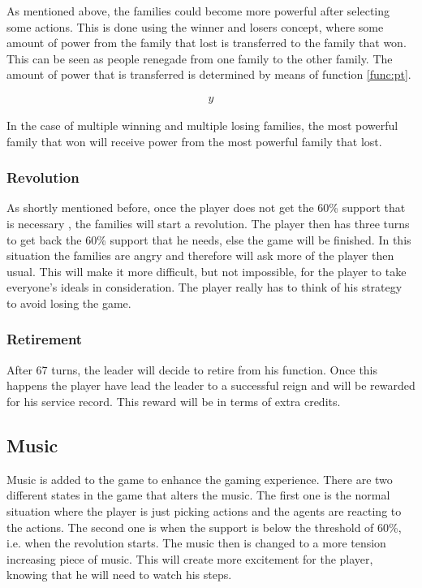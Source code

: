 \documentclass[11pt,a4paper]{article}
\begin{document}
As mentioned above, the families could become more powerful after selecting some actions. This is done using the winner and losers concept, where some amount of power from the  family that lost is transferred to the family that won. This can be seen as people renegade from one family to the other family. The amount of power that is transferred is determined by means of function \ref{func:pt}. 

\begin{align}
y
\label{func:pt}
\end{align}

In the case of multiple winning and multiple losing families, the most powerful family that won will receive power from the most powerful family that lost. 

\subsubsection{Revolution}
As shortly mentioned before, once the player does not get the 60\% support that is necessary , the families will start a revolution. The player then has three turns to get back the 60\% support that he needs, else the game will be finished. In this situation the families are angry and therefore will ask more of the player then usual. This will make it more difficult, but not impossible, for the player to take everyone's ideals in consideration. The player really has to think of his strategy to avoid losing the game.

\subsubsection{Retirement}
After 67 turns, the leader will decide to retire from his function. Once this happens the player have lead the leader to a successful reign and will be rewarded for his service record. This reward will be in terms of extra credits. 

\subsection{Music}
Music is added to the game to enhance the gaming experience. There are two different states in the game that alters the music. The first one is the normal situation where the player is just picking actions and the agents are reacting to the actions. The second one is when the support is below the threshold of 60\%, i.e. when the revolution starts. The music then is changed to a more tension increasing piece of music. This will create more excitement for the player, knowing that he will need to watch his steps. 
\end{document}
